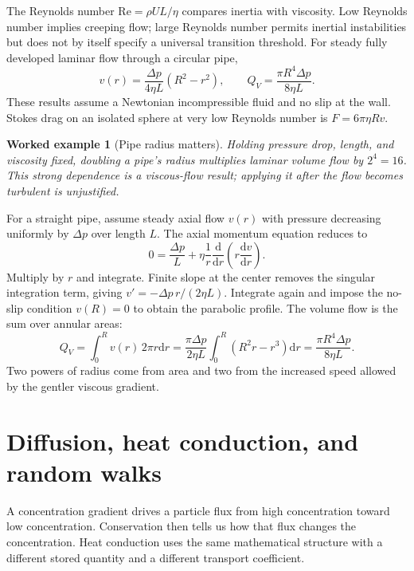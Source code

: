 \documentclass[11pt,oneside]{book}
\newcommand{\dd}{\mathrm{d}}
\newcommand{\od}[2]{\frac{\dd #1}{\dd #2}}
\theoremstyle{reviewstyle}
\newtheorem{example}{Worked example}[chapter]
\begin{document}
The Reynolds number $\mathrm{Re}=\rho UL/\eta$ compares inertia with viscosity. Low Reynolds number implies creeping flow; large Reynolds number permits inertial instabilities but does not by itself specify a universal transition threshold. For steady fully developed laminar flow through a circular pipe,
\begin{equation}
v(r)=\frac{\Delta p}{4\eta L}(R^2-r^2),\qquad
Q_V=\frac{\pi R^4\Delta p}{8\eta L}.
\end{equation}
These results assume a Newtonian incompressible fluid and no slip at the wall. Stokes drag on an isolated sphere at very low Reynolds number is $F=6\pi\eta Rv$.
\begin{example}[Pipe radius matters]
Holding pressure drop, length, and viscosity fixed, doubling a pipe's radius multiplies laminar volume flow by $2^4=16$. This strong dependence is a viscous-flow result; applying it after the flow becomes turbulent is unjustified.
\end{example}

For a straight pipe, assume steady axial flow $v(r)$ with pressure decreasing uniformly by $\Delta p$ over length $L$. The axial momentum equation reduces to
\begin{equation}
0=\frac{\Delta p}{L}+\eta\frac1r\od{}{r}\left(r\od vr\right).
\end{equation}
Multiply by $r$ and integrate. Finite slope at the center removes the singular integration term, giving $v'=-\Delta p\,r/(2\eta L)$. Integrate again and impose the no-slip condition $v(R)=0$ to obtain the parabolic profile. The volume flow is the sum over annular areas:
\begin{equation}
Q_V=\int_0^Rv(r)\,2\pi r\dd r
=\frac{\pi\Delta p}{2\eta L}\int_0^R(R^2r-r^3)\dd r
=\frac{\pi R^4\Delta p}{8\eta L}.
\end{equation}
Two powers of radius come from area and two from the increased speed allowed by the gentler viscous gradient.

\section{Diffusion, heat conduction, and random walks}
A concentration gradient drives a particle flux from high concentration toward low concentration. Conservation then tells us how that flux changes the concentration. Heat conduction uses the same mathematical structure with a different stored quantity and a different transport coefficient.
\end{document}
